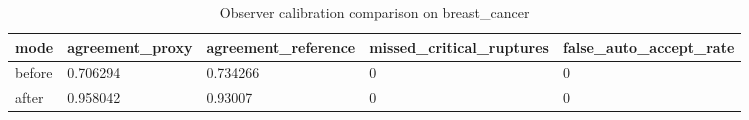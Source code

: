 \begin{table}[h]
\centering
\caption{Observer calibration comparison on breast\_cancer}
\label{tab:observer\_calibration}
\begin{tabular}{|l|l|l|l|l|}
\hline
mode & agreement\_proxy & agreement\_reference & missed\_critical\_ruptures & false\_auto\_accept\_rate \\
\hline
before & 0.706294 & 0.734266 & 0 & 0 \\
\hline
after & 0.958042 & 0.93007 & 0 & 0 \\
\hline
\end{tabular}
\end{table}
